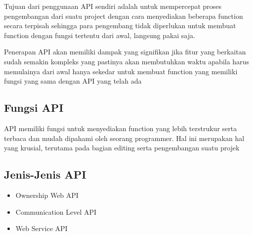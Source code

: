 Tujuan dari penggunaan API sendiri adalah untuk mempercepat proses pengembangan dari suatu project dengan cara menyediakan beberapa function secara terpisah sehingga para pengembang tidak diperlukan untuk membuat function dengan fungsi tertentu dari awal, langsung pakai saja.

Penerapan API akan memiliki dampak yang signifikan jika fitur yang berkaitan sudah semakin kompleks yang pastinya akan membutuhkan waktu apabila harus memulainya dari awal hanya sekedar untuk membuat function yang memiliki fungsi yang sama dengan API yang telah ada

\subsection{Fungsi API}
API memiliki fungsi untuk menyediakan function yang lebih terstrukur serta terbaca dan mudah dipahami oleh seorang programmer. Hal ini merupakan hal yang krusial, terutama pada bagian editing serta pengembangan suatu projek

\subsection{Jenis-Jenis API}
\begin{itemize}
	\item Ownership Web API
	\item Communication Level API
	\item Web Service API
\end{itemize}